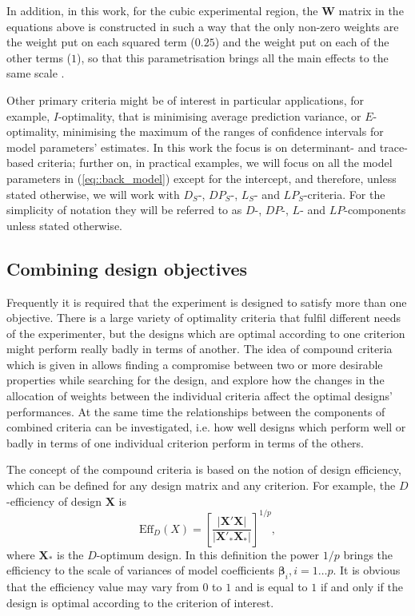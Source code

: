 In addition, in this work, for the cubic experimental region, the $\bm{W}$ matrix in the equations above is constructed in such a way that the only non-zero weights are the weight put on each squared term ($0.25$) and the weight put on each of the other terms ($1$), so that this parametrisation brings all the main effects to the same scale \citep{atkinson1993optimum}. \label{W_matrix}

Other primary criteria might be of interest in particular applications, for example, $I$-optimality, that is minimising average prediction variance, or $E$-optimality, minimising the maximum of the ranges of confidence intervals for model parameters' estimates. In this work the focus is on determinant- and trace-based criteria; further on, in practical examples, we will focus on all the model parameters in (\ref{eq::back_model}) except for the intercept, and therefore, unless stated otherwise, we will work with $D_S$-, $DP_S$-, $L_S$- and $LP_S$-criteria. For the simplicity of notation they will be referred to as $D$-, $DP$-, $L$- and $LP$-components unless stated otherwise. 

\subsection{Combining design objectives}

Frequently it is required that the experiment is designed to satisfy more than one objective. There is a large variety of optimality criteria that fulfil different needs of the experimenter, but the designs which are optimal according to one criterion might perform really badly in terms of another. The idea of compound criteria which is given in \citet{Atkinson2007} allows finding a compromise between two or more desirable properties while searching for the design, and explore how the changes in the allocation of weights between the individual criteria affect the optimal designs' performances. At the same time the relationships between the components of combined criteria can be investigated, i.e. how well designs which perform well or badly in terms of one individual criterion perform in terms of the others. 

The concept of the compound criteria is based on the notion of design efficiency, which can be defined for any design matrix and any criterion. For example, the $D$-efficiency of design $\bm{X}$ is
\begin{equation}
\label{eq::D_eff}
\mbox{Eff}_{D}(X)=\left[\frac{\vert \bm{X}'\bm{X}\vert}{\vert \bm{X}'_{*}\bm{X}_{*}\vert}\right]^{1/p},
\end{equation}   
where $\bm{X}_{*}$ is the $D$-optimum design. In this definition the power $1/p$ brings the efficiency to the scale of variances of model coefficients $\bm{\beta}_{i}, i=1\ldots p.$ It is obvious that the efficiency value may vary from $0$ to $1$ and is equal to $1$ if and only if the design is optimal according to the criterion of interest.
  
